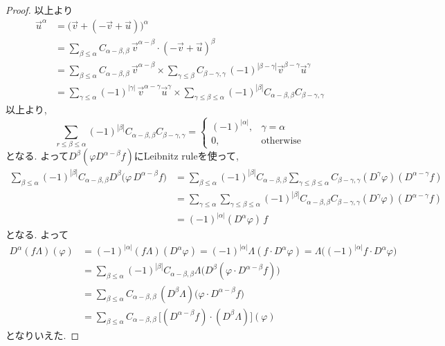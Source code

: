 \begin{proof}
以上より
\begin{align*}
\vec{u}^{\alpha}
&= \bigl(\vec{v} + (-\vec{v} + \vec{u})\bigr)^{\alpha} \\[6pt]
&= \sum_{\beta \leq \alpha} C_{\alpha-\beta,\beta}\,
   \vec{v}^{\alpha-\beta} \cdot (-\vec{v} + \vec{u})^{\beta} \\[6pt]
&= \sum_{\beta \leq \alpha} C_{\alpha-\beta,\beta}\,
   \vec{v}^{\alpha-\beta} \times
   \sum_{\gamma \leq \beta} C_{\beta-\gamma,\gamma}\,
   (-1)^{|\beta-\gamma|}\vec{v}^{\beta-\gamma}\vec{u}^{\gamma} \\[6pt]
&= \sum_{\gamma \leq \alpha} (-1)^{|\gamma|}\,
   \vec{v}^{\alpha-\gamma}\vec{u}^{\gamma}
   \times \sum_{\gamma \leq \beta \leq \alpha}
   (-1)^{|\beta|} C_{\alpha-\beta,\beta} C_{\beta-\gamma,\gamma}
\end{align*}
以上より, 
\[
 \sum_{r \le \beta \le \alpha} (-1)^{|\beta|} C_{\alpha-\beta,\beta} C_{\beta-\gamma,\gamma} = 
\begin{cases}
(-1)^{|\alpha|}, & \gamma = \alpha \\
0, & \text{otherwise}
\end{cases}
\]
となる.
よって\(D^\beta \left( \varphi D^{\alpha-\beta} f \right)\)にLeibnitz ruleを使って, 
\begin{align*}
\sum_{\beta \le \alpha} 
  (-1)^{|\beta|} C_{\alpha-\beta,\beta} D^\beta \bigl(\varphi \, D^{\alpha-\beta} f \bigr)
&= \sum_{\beta \le \alpha} 
   (-1)^{|\beta|} C_{\alpha-\beta,\beta} 
   \sum_{\gamma \le \beta \le \alpha} 
   C_{\beta-\gamma, \gamma} (D^\gamma \varphi) (D^{\alpha-\gamma} f) \\[6pt]
&= \sum_{\gamma \le \alpha}  
   \sum_{\gamma \le \beta \le \alpha} 
   (-1)^{|\beta|}C_{\alpha-\beta,\beta} C_{\beta-\gamma, \gamma} 
   (D^\gamma \varphi) (D^{\alpha-\gamma} f) \\[6pt]
&= (-1)^{|\alpha|} (D^\alpha \varphi)\, f
\end{align*}
となる. よって
\begin{align*}
D^\alpha(f\Lambda)(\varphi)
&= (-1)^{|\alpha|} (f\Lambda)(D^\alpha \varphi) = (-1)^{|\alpha|} \Lambda(f \cdot D^\alpha \varphi) = \Lambda\big( (-1)^{|\alpha|} f \cdot D^\alpha \varphi \big) \\[6pt]
&= \sum_{\beta \le \alpha} 
   (-1)^{|\beta|} C_{\alpha-\beta,\beta}
   \Lambda\big( D^\beta(\varphi \cdot D^{\alpha-\beta} f) \big) \\[6pt]
&= \sum_{\beta \le \alpha} 
   C_{\alpha-\beta,\beta} \, (D^\beta \Lambda)\big( \varphi \cdot D^{\alpha-\beta} f \big) \\[6pt]
&= \sum_{\beta \le \alpha} 
   C_{\alpha-\beta,\beta} \, \big[ (D^{\alpha-\beta} f) \cdot (D^\beta \Lambda) \big](\varphi)
\end{align*}
となりいえた. 
\end{proof}


